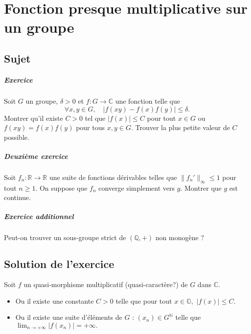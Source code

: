 \chapter[Fonction presque multiplicative]{Fonction presque multiplicative sur un groupe}

\section{Sujet}

\paragraph{Exercice}
Soit $G$ un groupe, $\delta > 0$ et $f : G \to \mathbb C$ une fonction telle que
\[
\forall x,y \in G,\quad |f(xy)-f(x)f(y)| \leqslant \delta.
\]
Montrer qu'il existe $C > 0$ tel que $|f(x)| \leqslant C$ pour tout $x \in G$ ou $f(xy) = f(x)f(y)$ pour tous $x,y \in G$.
Trouver la plus petite valeur de $C$ possible.

\paragraph{Deuxième exercice}

Soit $f_n : \mathbb R \to \mathbb R$ une suite de fonctions dérivables telles que $\|f_n'\|_\infty \leqslant 1$ pour tout $n\geqslant 1$. On suppose que $f_n$ converge simplement vers $g$. Montrer que $g$ est continue.

\paragraph{Exercice additionnel}
Peut-on trouver un sous-groupe strict de $(\mathbb Q,+)$ non monogène ?

\section{Solution de l'exercice} %

Soit $f$ un quasi-morphisme multiplicatif (quasi-caractère?) de $G$ dans $\mathbb{C}.$\\

\begin{itemize}
\item Ou il existe une constante $C>0$ telle que pour tout $x\in \mathbb{G},$ $\displaystyle \vert f(x) \vert \leq C.$
\item Ou il existe une suite d'éléments de $G$ : $\displaystyle (x_{n})\in G^{\mathbb{N}}$ telle que $\displaystyle \lim_{n\rightarrow +\infty} \vert f(x_{n})\vert =+\infty.$
\end{itemize}

